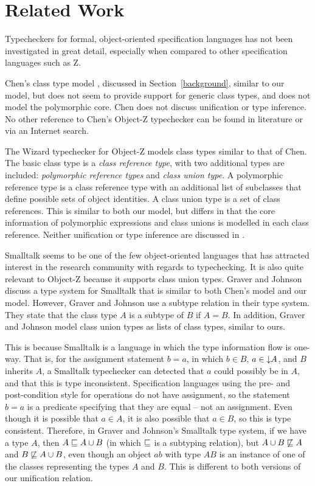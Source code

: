 \section{Related Work}

Typecheckers for formal, object-oriented specification languages has
not been investigated in great detail, especially when compared to
other specification languages such as Z.

Chen's class type model \cite{chen94}, discussed in
Section~\ref{background}, similar to our model, but does not seem to
provide support for generic class types, and does not model the
polymorphic core. Chen does not discuss unification or type
inference. No other reference to Chen's Object-Z typechecker can be
found in literature or via an Internet search.

The Wizard typechecker for Object-Z \cite{johnston96} models class
types similar to that of Chen. The basic class type is a {\em class
reference type}, with two additional types are included: {\em
polymorphic reference types} and {\em class union type}. A polymorphic
reference type is a class reference type with an additional list of
subclasses that define possible sets of object identities. A class
union type is a set of class references. This is similar to both our
model, but differs in that the core information of polymorphic
expressions and class unions is modelled in each class
reference. Neither unification or type inference are discussed in
\cite{johnston96}.

Smalltalk \cite{goldberg83} seems to be one of the few object-oriented
languages that has attracted interest in the research community with
regards to typechecking. It is also quite relevant to Object-Z because
it supports class union types. Graver and Johnson \cite{graver90}
discuss a type system for Smalltalk that is similar to both Chen's
model and our model. However, Graver and Johnson use a subtype
relation in their type system.
They state that the class type $A$ is a subtype of
$B$ if $A = B$. In addition, Graver and Johnson model class union
types as lists of class types, similar to ours. 

This is because Smalltalk is a language in which the type information
flow is one-way. That is, for the assignment statement $b = a$, in
which $b \in B$, $a \in \mathord\downarrow A$, and $B$ inherits $A$, a Smalltalk
typechecker can detected that $a$ could possibly be in $A$, and that
this is type inconsistent. Specification languages using the pre- and
post-condition style for operations do not have assignment, so the
statement $b = a$ is a predicate specifying that they are equal -- not
an assignment. Even though it is possible that $a \in A$, it is also
possible that $a \in B$, so this is type consistent. Therefore, in
Graver and Johnson's Smalltalk type system, if we have a type $A$,
then $A \subtypeeq A \classuni B$ (in which $\mathrel{\mathstrut{\sqsubseteq}}$ is a
subtyping relation), but $A \classuni B \not\subtypeeq A$ and $B
\not\subtypeeq A \classuni B$, even though an object $ab$ with type
$AB$ is an instance of one of the classes representing the types $A$
and $B$. This is different to both versions of our unification
relation.
